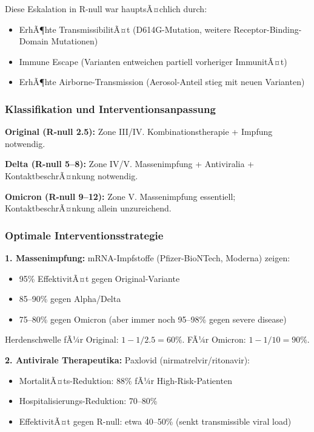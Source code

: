 ﻿\documentclass[a4paper,12pt,twoside]{article}
\theoremstyle{definition}
\begin{document}
Diese Eskalation in R-null war hauptsÃ¤chlich durch:
\begin{itemize}
\item ErhÃ¶hte TransmissibilitÃ¤t (D614G-Mutation, weitere Receptor-Binding-Domain Mutationen)
\item Immune Escape (Varianten entweichen partiell vorheriger ImmunitÃ¤t)
\item ErhÃ¶hte Airborne-Transmission (Aerosol-Anteil stieg mit neuen Varianten)
\end{itemize}

\subsubsection{Klassifikation und Interventionsanpassung}

\textbf{Original (R-null 2.5):} Zone III/IV. Kombinationstherapie + Impfung notwendig.

\textbf{Delta (R-null 5--8):} Zone IV/V. Massenimpfung + Antiviralia + KontaktbeschrÃ¤nkung notwendig.

\textbf{Omicron (R-null 9--12):} Zone V. Massenimpfung essentiell; KontaktbeschrÃ¤nkung allein unzureichend.

\subsubsection{Optimale Interventionsstrategie}

\textbf{1. Massenimpfung:} mRNA-Impfstoffe (Pfizer-BioNTech, Moderna) zeigen:
\begin{itemize}
\item 95\% EffektivitÃ¤t gegen Original-Variante
\item 85--90\% gegen Alpha/Delta
\item 75--80\% gegen Omicron (aber immer noch 95--98\% gegen severe disease)
\end{itemize}

Herdenschwelle fÃ¼r Original: $1 - 1/2.5 = 60\%$. FÃ¼r Omicron: $1 - 1/10 = 90\%$.

\textbf{2. Antivirale Therapeutika:} Paxlovid (nirmatrelvir/ritonavir):
\begin{itemize}
\item MortalitÃ¤ts-Reduktion: 88\% fÃ¼r High-Risk-Patienten
\item Hospitalisierungs-Reduktion: 70--80\%
\item EffektivitÃ¤t gegen R-null: etwa 40--50\% (senkt transmissible viral load)
\end{itemize}
\end{document}
